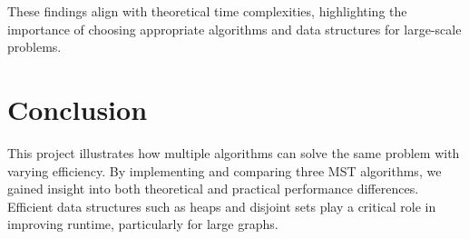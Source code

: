 \documentclass[11pt]{article}
\begin{document}
These findings align with theoretical time complexities, highlighting the importance of choosing appropriate algorithms and data structures for large-scale problems.

\section{Conclusion}

This project illustrates how multiple algorithms can solve the same problem with varying efficiency. By implementing and comparing three MST algorithms, we gained insight into both theoretical and practical performance differences. Efficient data structures such as heaps and disjoint sets play a critical role in improving runtime, particularly for large graphs.
\end{document}
